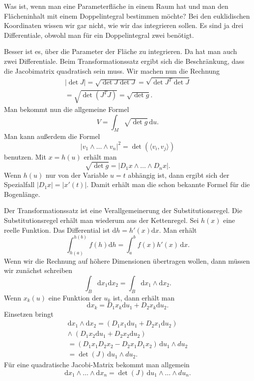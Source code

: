 \documentclass[a4paper,11pt,fleqn,twocolumn,twoside]{scrartcl}
\numberwithin{equation}{section}
\begin{document}
Was ist, wenn man eine Parameterfläche in einem Raum hat und man den
Flächeninhalt mit einem Doppelintegral bestimmen möchte? Bei den
euklidischen Koordinaten wissen wir gar nicht, wie wir das integrieren
sollen. Es sind ja drei Differentiale, obwohl man für ein
Doppelintegral zwei benötigt.

Besser ist es, über die Parameter der Fläche zu integrieren.
Da hat man auch zwei Differentiale. Beim Transformationssatz ergibt
sich die Beschränkung, dass die Jacobimatrix quadratisch sein muss.
Wir machen nun die Rechnung
\begin{gather*}
|{\det J}| = \sqrt{\det J\det J}
= \sqrt{\det J^T\det J}\\
= \sqrt{\det(J^TJ)} = \sqrt{\det g}.
\end{gather*}
Man bekommt nun die allgemeine Formel
\begin{equation}
V = \int_M \sqrt{\det g}\,\mathrm du.
\end{equation}
Man kann außerdem die Formel
\begin{equation}
|v_1\wedge\ldots\wedge v_n|^2 = \det(\langle v_i,v_j\rangle)
\end{equation}
benutzen. Mit $x=h(u)$ erhält man
\begin{equation}
\sqrt{\det g} = |D_1 x\wedge\ldots\wedge D_n x|.
\end{equation}
Wenn $h(u)$ nur von der Variable $u=t$ abhängig ist, dann ergibt
sich der Spezialfall $|D_1 x| = |x'(t)|$. Damit erhält man die schon
bekannte Formel für die Bogenlänge.

Der Transformationssatz ist eine Verallgemeinerung der
Substitutionsregel. Die Substitutionsregel erhält man wiederum aus
der Kettenregel. Sei $h(x)$ eine reelle Funktion.
Das Differential ist $\mathrm dh = h'(x)\mathrm dx$. Man erhält
\begin{equation}
\int_{h(a)}^{h(b)} f(h)\mathrm dh = \int_a^b f(x) h'(x)\,\mathrm dx.
\end{equation}
Wenn wir die Rechnung auf höhere Dimensionen übertragen wollen, dann
müssen wir zunächst schreiben
\begin{equation}
\int_B \mathrm dx_1\mathrm dx_2 = \int_B \mathrm dx_1\wedge\mathrm dx_2.
\end{equation}
Wenn $x_k(u)$ eine Funktion der $u_k$ ist, dann erhält man
\begin{equation}
\mathrm dx_k = D_1x_k\mathrm du_1+D_2x_k\mathrm du_2.
\end{equation}
Einsetzen bringt
\begin{gather*}
\mathrm dx_1\wedge\mathrm dx_2
= (D_1x_1\mathrm du_1+D_2x_1\mathrm du_2)\\
\wedge\; (D_1x_2\mathrm du_1+D_2x_2\mathrm du_2)\\
= (D_1 x_1 D_2 x_2 - D_2 x_1 D_1 x_2)\,\mathrm du_1\wedge du_2\\
= \det(J)\,\mathrm du_1\wedge du_2.
\end{gather*}
Für eine quadratische Jacobi-Matrix bekommt man allgemein
\begin{equation}
\mathrm dx_1\wedge\ldots\wedge\mathrm dx_n
= \det(J)\,\mathrm du_1\wedge\ldots\wedge du_n.
\end{equation}
\end{document}
